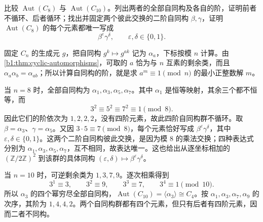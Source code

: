 \begin{exercise}\label{b1:ex:03-cyclic-automorphisms-eight-ten}
	比较 \(\operatorname{Aut}(C_8)\) 与 \(\operatorname{Aut}(C_{10})\)。列出两者的全部自同构及各自的阶，证明前者不循环、后者循环；找出并固定两个彼此交换的二阶自同构 \(\beta,\gamma\)，证明 \(\operatorname{Aut}(C_8)\) 的每个元素都唯一写成
	\[
		\beta^\varepsilon\gamma^\delta, \qquad \varepsilon,\delta\in\{0,1\}.
	\]
\end{exercise}
\begin{solution}
	固定 \(C_n\) 的生成元 \(g\)，把自同构 \(g^k\mapsto g^{ak}\) 记为 \(\alpha_a\)，下标按模 \(n\) 计算。由\cref{b1:thm:cyclic-automorphisms}，可取的 \(a\) 恰为与 \(n\) 互素的剩余类，而且 \(\alpha_a\alpha_b=\alpha_{ab}\)；所以计算自同构的阶，就是求 \(a^m\equiv1\pmod n\) 的最小正整数解 \(m\)。

	当 \(n=8\) 时，全部自同构为 \(\alpha_1,\alpha_3,\alpha_5,\alpha_7\)。其中 \(\alpha_1\) 是恒等映射，其余三个都不恒等，而
	\[
		3^2\equiv5^2\equiv7^2\equiv1\pmod8.
	\]
	因此它们的阶依次为 \(1,2,2,2\)，没有四阶元素，故此四阶自同构群不循环。取 \(\beta=\alpha_3\)、\(\gamma=\alpha_5\)。又因 \(3\cdot5\equiv7\pmod8\)，每个元素恰好写成 \(\beta^\varepsilon\gamma^\delta\)，其中 \(\varepsilon,\delta\in\{0,1\}\)。这两个二阶自同构彼此交换，是因为模 \(8\) 的乘法交换；四种表达式分别为 \(\alpha_1,\alpha_3,\alpha_5,\alpha_7\)，互不相同，故表达唯一。这也给出从逐坐标相加的 \((\mathbb Z/2\mathbb Z)^2\) 到该群的具体同构 \((\varepsilon,\delta)\mapsto\beta^\varepsilon\gamma^\delta\)。

	当 \(n=10\) 时，可逆剩余类为 \(1,3,7,9\)。逐次相乘得到
	\[
		3^1\equiv3,\qquad3^2\equiv9,\qquad 3^3\equiv7,\qquad3^4\equiv1\pmod{10}.
	\]
	所以 \(\alpha_3\) 的四个幂穷尽全部自同构，\(\operatorname{Aut}(C_{10})=\langle\alpha_3\rangle\cong C_4\)。按 \(\alpha_1,\alpha_3,\alpha_7,\alpha_9\) 的次序，其阶为 \(1,4,4,2\)。两个自同构群都有四个元素，但只有后者有四阶元素，因而二者不同构。
\end{solution}


